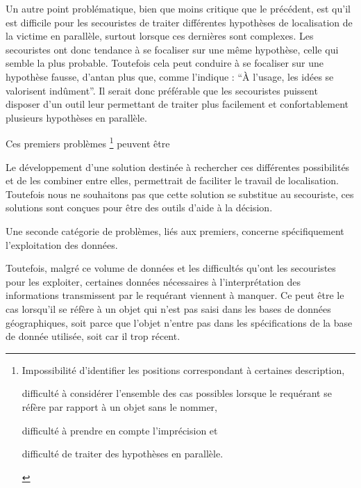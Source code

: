 Un autre point problématique, bien que moins critique que le
précédent, est qu'il est difficile pour les secouristes de traiter
différentes hypothèses de localisation de la victime en parallèle,
surtout lorsque ces dernières sont complexes. Les secouristes ont donc
tendance à se focaliser sur une même hypothèse, celle qui semble la
plus probable. Toutefois cela peut conduire à se focaliser sur une
hypothèse fausse, d’antan plus que, comme l'indique
\textcite{Bachelard1934} : \enquote{À l'usage, les idées se valorisent
  indûment}. Il serait donc préférable que les secouristes puissent
disposer d'un outil leur permettant de traiter plus facilement et
confortablement plusieurs hypothèses en parallèle.

Ces premiers problèmes \footnote{%
  \begin{enumerate*}[label=(\arabic*)]
  \item Impossibilité d'identifier les positions correspondant à
certaines description,
  \item difficulté à considérer l'ensemble des cas possibles lorsque
le requérant se réfère par rapport à un objet sans le nommer,
  \item difficulté à prendre en compte l'imprécision et
  \item difficulté de traiter des hypothèses en parallèle.
  \end{enumerate*}} peuvent être

Le développement d'une solution destinée à rechercher ces
différentes possibilités et de les combiner entre elles, permettrait
de faciliter le travail de localisation. Toutefois nous ne souhaitons
pas que cette solution se substitue au secouriste, ces solutions sont
conçues pour être des outils d'aide à la décision.

Une seconde catégorie de problèmes, liés aux premiers, concerne
spécifiquement l'exploitation des données.

Toutefois, malgré ce volume de données et les difficultés qu'ont les
secouristes pour les exploiter, certaines données nécessaires à
l'interprétation des informations transmissent par le requérant
viennent à manquer. Ce peut être le cas lorsqu'il se réfère à un objet
qui n'est pas saisi dans les bases de données géographiques, soit
parce que l'objet n'entre pas dans les spécifications de la base de
donnée utilisée, soit car il trop récent.


